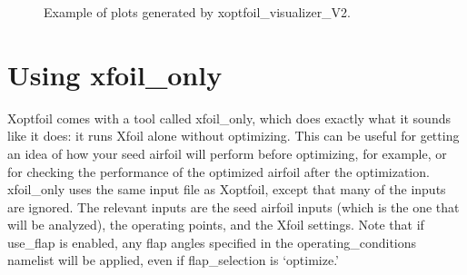 \documentclass[11pt]{article}
\begin{document}
\begin{figure}
\centering

\caption{Example of plots generated by xoptfoil\_visualizer\_V2.}
\label{fig:visualizer_plot}
\end{figure}

\section{Using xfoil\_only}

Xoptfoil comes with a tool called xfoil\_only, which does exactly what it sounds like it
does: it runs Xfoil alone without optimizing. This can be useful for getting an idea of
how your seed airfoil will perform before optimizing, for example, or for checking the
performance of the optimized airfoil after the optimization. xfoil\_only uses the same
input file as Xoptfoil, except that many of the inputs are ignored. The relevant
inputs are the seed airfoil inputs (which is the one that will be analyzed), the operating
points, and the Xfoil settings. Note that if use\_flap is enabled, any flap angles 
specified in the operating\_conditions namelist will be applied, even if flap\_selection
is `optimize.' 
\end{document}
